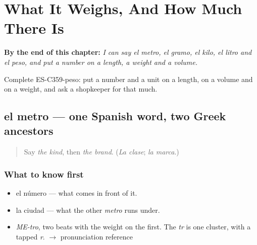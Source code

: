 
\chapter{What It Weighs, And How Much There Is}
\label{ch:el-kilo-y-el-litro}

\begin{chapteropening}
\textbf{By the end of this chapter:} \emph{I can say el metro, el gramo, el kilo, el litro and el peso, and put a number on a length, a weight and a volume.}

Complete ES-C359-peso: put a number and a unit on a length, on a volume and on a weight, and ask a shopkeeper for that much.
\end{chapteropening}

\section[el metro]{el metro — one Spanish word, two Greek ancestors}

\label{lesson:ES-C359-metro}



\begin{quote}
Say \emph{the kind}, then \emph{the brand}. (\emph{La clase}; \emph{la marca}.)
\end{quote}

\subsection*{What to know first}
\begin{itemize}
\raggedright
  \item el número — what comes in front of it.
  \item la ciudad — what the other \emph{metro} runs under.
\end{itemize}

\begin{sounds}
\begin{itemize}
\raggedright
  \item \emph{ME-tro}, two beats with the weight on the first. The \emph{tr} is one cluster, with a tapped \emph{r}. $\to$ pronunciation reference
\end{itemize}
\end{sounds}

